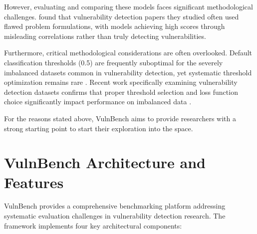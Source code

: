 \documentclass[letterpaper]{article}
\begin{document}
However, evaluating and comparing these models faces significant methodological challenges. \cite{risse2025top} found that vulnerability detection papers they studied often used flawed problem formulations, with models achieving high scores through misleading correlations rather than truly detecting vulnerabilities. 

Furthermore, critical methodological considerations are often overlooked. Default classification thresholds (0.5) are frequently suboptimal for the severely imbalanced datasets common in vulnerability detection, yet systematic threshold optimization remains rare \citep{ghost2021, leevy2023optimal}. Recent work specifically examining vulnerability detection datasets confirms that proper threshold selection and loss function choice significantly impact performance on imbalanced data \citep{he2025imbalance}.

For the reasons stated above, VulnBench aims to provide researchers with a strong starting point to start their exploration into the space.

\section{VulnBench Architecture and Features}

VulnBench provides a comprehensive benchmarking platform addressing systematic evaluation challenges in vulnerability detection research. The framework implements four key architectural components:
\end{document}
